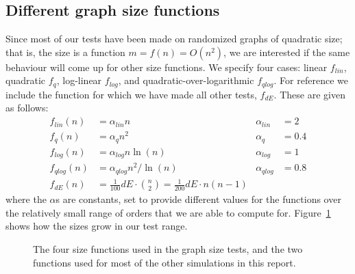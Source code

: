 \documentclass{cslthse-msc}
\newcommand{\density}{dE}
\begin{document}
\subsection{Different graph size functions}\label{differentdensities}
Since most of our tests have been made on randomized graphs of quadratic size; that is, the size is a function $m = f(n) = O(n^2)$, we are interested if the same behaviour will come up for other size functions. We specify four cases: linear $f_{lin}$, quadratic $f_q$, log-linear $f_{log}$, and quadratic-over-logarithmic $f_{qlog}$. For reference we include the function for which we have made all other tests, $f_{\density{}}$. These are given as follows:
\begin{align*}
  f_{lin}(n) & = \alpha_{lin} n & \alpha_{lin} &= 2\\
  f_q(n) & = \alpha_q n^2 & \alpha_{q} &= 0.4 \\
  f_{log}(n) & = \alpha_{log} n \ln(n) & \alpha_{log} &= 1 \\
  f_{qlog}(n) & = \alpha_{qlog} n^2 / \ln(n) & \alpha_{qlog} &= 0.8 \\
  f_{\density{}}(n) & = \frac{1}{100}\density{}\cdot\binom{n}{2} = \frac{1}{200}\density{}\cdot n(n-1) &  &
\end{align*}  
where the $\alpha$s are constants, set to provide different values for the functions over the relatively small range of orders that we are able to compute for. Figure~\ref{densities} shows how the sizes grow in our test range.

\begin{figure}[h]
 \centering
{}
 \caption{The four size functions used in the graph size tests, and the two functions used for most of the other simulations in this report.}
 \label{densities}
\end{figure}
\end{document}
